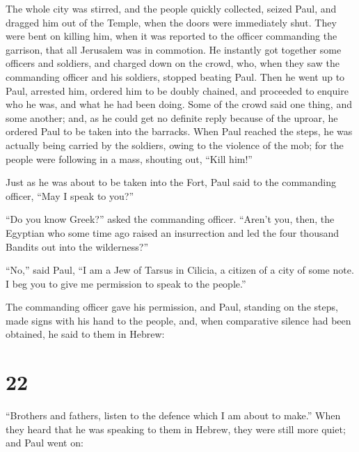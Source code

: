  The whole city was stirred, and the people quickly
collected, seized Paul, and dragged him out of the Temple, when the
doors were immediately shut.  They were bent on killing
him, when it was reported to the officer commanding the garrison, that
all Jerusalem was in commotion.  He instantly got together
some officers and soldiers, and charged down on the crowd, who, when
they saw the commanding officer and his soldiers, stopped beating Paul.
 Then he went up to Paul, arrested him, ordered him to be
doubly chained, and proceeded to enquire who he was, and what he had
been doing.  Some of the crowd said one thing, and some
another; and, as he could get no definite reply because of the uproar,
he ordered Paul to be taken into the barracks.  When Paul
reached the steps, he was actually being carried by the soldiers, owing
to the violence of the mob;  for the people were following
in a mass, shouting out, ``Kill him!''

 Just as he was about to be taken into the Fort, Paul said
to the commanding officer, ``May I speak to you?''

``Do you know Greek?'' asked the commanding officer. 
``Aren't you, then, the Egyptian who some time ago raised an
insurrection and led the four thousand Bandits out into the
wilderness?''

 ``No,'' said Paul, ``I am a Jew of Tarsus in Cilicia, a
citizen of a city of some note. I beg you to give me permission to speak
to the people.''

 The commanding officer gave his permission, and Paul,
standing on the steps, made signs with his hand to the people, and, when
comparative silence had been obtained, he said to them in Hebrew:

\hypertarget{section-21}{%
\section{22}\label{section-21}}

 ``Brothers and fathers, listen to the defence which I am
about to make.''  When they heard that he was speaking to
them in Hebrew, they were still more quiet; and Paul went on:

